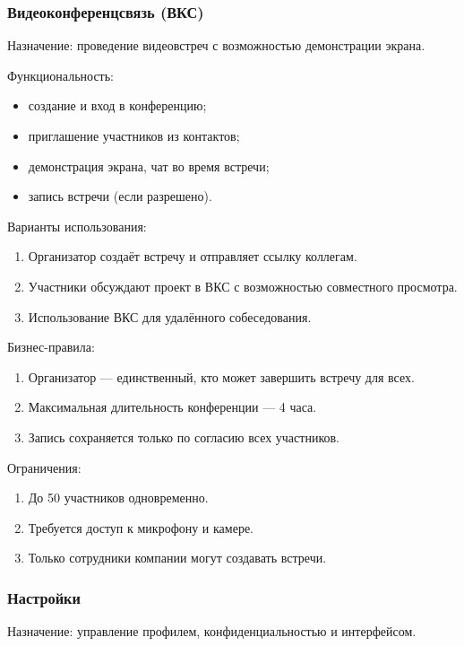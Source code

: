 \subsubsection{Видеоконференцсвязь (ВКС)}

Назначение: проведение видеовстреч с возможностью демонстрации экрана.

Функциональность:
\begin{itemize}
  \item создание и вход в конференцию;
  \item приглашение участников из контактов;
  \item демонстрация экрана, чат во время встречи;
  \item запись встречи (если разрешено).
\end{itemize}

Варианты использования:
\begin{enumerate}
  \item Организатор создаёт встречу и отправляет ссылку коллегам.
  \item Участники обсуждают проект в ВКС с возможностью совместного просмотра.
  \item Использование ВКС для удалённого собеседования.
\end{enumerate}

Бизнес-правила:
\begin{enumerate}
  \item Организатор — единственный, кто может завершить встречу для всех.
  \item Максимальная длительность конференции — 4 часа.
  \item Запись сохраняется только по согласию всех участников.
\end{enumerate}

Ограничения:
\begin{enumerate}
  \item До 50 участников одновременно.
  \item Требуется доступ к микрофону и камере.
  \item Только сотрудники компании могут создавать встречи.
\end{enumerate}

\subsubsection{Настройки}

Назначение: управление профилем, конфиденциальностью и интерфейсом.


